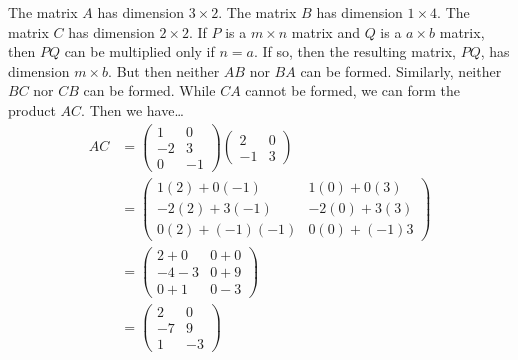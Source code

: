 \documentclass[11pt,letterpaper]{article}
\begin{document}
\sol The matrix $A$ has dimension $3 \times 2$. The matrix $B$ has dimension $1 \times 4$. The matrix $C$ has dimension $2 \times 2$. If $P$ is a $m \times n$ matrix and $Q$ is a $a \times b$ matrix, then $PQ$ can be multiplied only if $n= a$. If so, then the resulting matrix, $PQ$, has dimension $m \times b$. But then neither $AB$ nor $BA$ can be formed. Similarly, neither $BC$ nor $CB$ can be formed. While $CA$ cannot be formed, we can form the product $AC$. Then we have\dots
	\[
	\begin{aligned}
	AC&= \begin{pmatrix} 1 & 0 \\ -2 & 3 \\ 0 & -1 \end{pmatrix} \begin{pmatrix} 2 & 0 \\ -1 & 3 \end{pmatrix} \\[0.3cm]
	&= \begin{pmatrix} 1(2) + 0(-1) & 1(0) + 0(3) \\ -2(2) + 3(-1) & -2(0) + 3(3) \\ 0(2) + (-1)(-1) & 0(0) + (-1)3 \end{pmatrix} \\[0.3cm]
	&= \begin{pmatrix} 2 + 0 & 0 + 0 \\ -4 - 3 & 0 + 9 \\ 0 + 1 & 0 - 3 \end{pmatrix} \\[0.3cm]
	&= \begin{pmatrix} 2 & 0 \\ -7 & 9 \\ 1 & -3 \end{pmatrix}
	\end{aligned}
	\]
\end{document}
